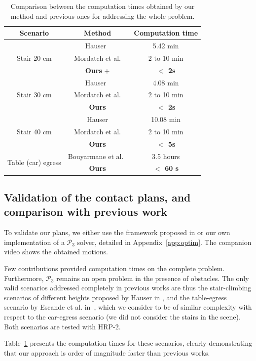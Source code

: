 \begin{table}
\centering
\begin{tabular}{ c | c | c }
 Scenario & Method  & Computation time \\
 \hline
   \multirow{3}{*}{Stair 20 cm} & Hauser~\cite{Hauser06usingmotion} &  5.42 min  \\							 
							  & Mordatch et al.\cite{Mordatch:2012:DCB:2185520.2185539} & 2 to 10 min \\
							 & \textbf{Ours} + \cite{Carpentier2016}  & \textbf{$ <$ 2s} \\
 \hline
   \multirow{3}{*}{Stair 30 cm} & Hauser~\cite{Hauser06usingmotion} &  4.08 min  \\
							 & Mordatch et al.\cite{Mordatch:2012:DCB:2185520.2185539} & 2 to 10 min \\
							 & \textbf{Ours}  & \textbf{$ <$ 2s}   \\
 \hline
   \multirow{3}{*}{Stair 40 cm} & Hauser \cite{Hauser06usingmotion} &  10.08 min  \\
							 & Mordatch et al.\cite{Mordatch:2012:DCB:2185520.2185539} & 2 to 10 min \\
							 & \textbf{Ours}   & \textbf{$ <$ 5s}   \\
 \hline
   \multirow{2}{*}{Table (car) egress} & Bouyarmane et al.~\cite{Bouyarmane2009, DBLP:conf/iser/EscandeKMG08} & 3.5 hours  \\
							 & \textbf{Ours}  & \textbf{$<$ 60 s} \\
							 
 \end{tabular}
\caption{Comparison between the computation times obtained by our method and previous ones for addressing the whole problem.}
\label{tab:compprev}
\quad
\end{table}

\subsection{Validation of the contact plans, and comparison with previous work} \label{sec:compa}
To validate our plans, we either use the framework proposed in \cite{Carpentier2016} or our own implementation of a $\mathcal{P}_3$ solver, detailed in Appendix~\ref{app:optim}.
The companion video shows the obtained motions.

Few contributions provided computation times on the complete problem. %
Furthermore, $\mathcal{P}_3$ remains an open problem in the presence of obstacles. The only valid scenarios addressed completely in previous works are thus the stair-climbing scenarios of different heights proposed by Hauser in \cite{Hauser06usingmotion}, and the table-egress scenario by Escande et al. in~\cite{DBLP:conf/iser/EscandeKMG08}, which we consider to be of similar complexity with respect to the car-egress scenario (we did not consider the stairs in the scene). Both scenarios are tested with HRP-2.

Table~\ref{tab:compprev} presents the computation times for these scenarios, clearly demonstrating that our approach is order of magnitude faster than previous works.



